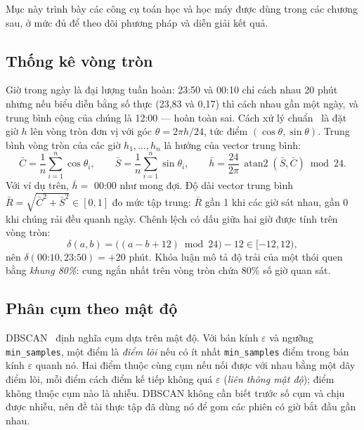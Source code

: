 Mục này trình bày các công cụ toán học và học máy được dùng trong các chương sau, ở mức đủ để theo dõi
phương pháp và diễn giải kết quả.

\subsection{Thống kê vòng tròn}
\label{sec:bg-circular}
Giờ trong ngày là đại lượng tuần hoàn: 23:50 và 00:10 chỉ cách nhau 20 phút nhưng nếu biểu diễn bằng
số thực (23,83 và 0,17) thì cách nhau gần một ngày, và trung bình cộng của chúng là 12:00 --- hoàn toàn
sai. Cách xử lý chuẩn~\cite{fisher1993circular} là đặt giờ $h$ lên vòng tròn đơn vị với góc
$\theta = 2\pi h/24$, tức điểm $(\cos\theta, \sin\theta)$. Trung bình vòng tròn của các giờ $h_1,\dots,h_n$
là hướng của vector trung bình:
\begin{equation}
  \bar C = \frac1n\sum_{i=1}^{n} \cos\theta_i,\qquad \bar S = \frac1n\sum_{i=1}^{n} \sin\theta_i,\qquad
  \bar h = \frac{24}{2\pi}\,\operatorname{atan2}(\bar S, \bar C) \bmod 24.
  \label{eq:circ-mean}
\end{equation}
Với ví dụ trên, $\bar h = $ 00:00 như mong đợi. Độ dài vector trung bình $\bar R = \sqrt{\bar C^2 + \bar S^2}
\in [0, 1]$ đo mức tập trung: $\bar R$ gần 1 khi các giờ sát nhau, gần 0 khi chúng rải đều quanh ngày.
Chênh lệch có dấu giữa hai giờ được tính trên vòng tròn:
\begin{equation}
  \delta(a,b) = \big((a-b+12) \bmod 24\big) - 12 \in [-12, 12),
  \label{eq:circ-diff}
\end{equation}
nên $\delta(\text{00:10}, \text{23:50}) = +20$ phút. Khóa luận mô tả độ trải của một thói quen bằng
\emph{khung 80\%}: cung ngắn nhất trên vòng tròn chứa 80\% số giờ quan sát.

\subsection{Phân cụm theo mật độ}
\label{sec:bg-dbscan}
DBSCAN~\cite{ester1996dbscan} định nghĩa cụm dựa trên mật độ. Với bán kính $\varepsilon$ và ngưỡng
\texttt{min\_samples}, một điểm là \emph{điểm lõi} nếu có ít nhất \texttt{min\_samples} điểm trong
bán kính $\varepsilon$ quanh nó. Hai điểm thuộc cùng cụm nếu nối được với nhau bằng một dãy điểm lõi, mỗi
điểm cách điểm kế tiếp không quá $\varepsilon$ (\emph{liên thông mật độ}); điểm không thuộc cụm nào là nhiễu.
DBSCAN không cần biết trước số cụm và chịu được nhiễu, nên đề tài thực tập đã dùng nó để gom các phiên có
giờ bắt đầu gần nhau.

